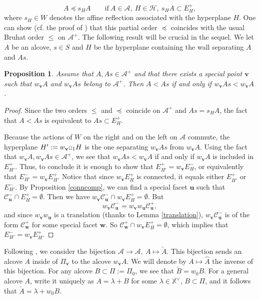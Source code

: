 \documentclass[11pt]{amsart}
\theoremstyle{plain}
\newtheorem{prop}[thm]{Proposition}
\theoremstyle{remark}
\newcommand{\car}{\mbox{\relsize{-5}$\Box$}}
\numberwithin{equation}{section}
\begin{document}
	$$A\preceq s_HA\qquad\text{if}~ A\in\mathcal{A},~H\in \mathscr{H},~s_HA\subset E^+_H,$$
	where $s_H\in W$ denotes the affine reflection associated with the hyperplane $H$. One can show (cf. the proof of \cite[Claim 4.14]{Soergel1997KazhdanLusztigPA}) that this partial order $\preceq$ coincides with the usual Bruhat order $\leq$ on $\mathcal{A}^+$. The following result will be crucial in the sequel. We let $A$ be an alcove, $s\in S$ and $H$ be the hyperplane containing the wall separating $A$ and $As$.
	\begin{prop}\label{reverse order}
		Assume that $A,As\in\mathcal{A}^+$ and that there exists a special point $\mathbf{v}$ such that $w_\mathbf{v}A$ and $w_\mathbf{v}As$ belong to $\mathcal{A}^+$. Then $A<As$ if and only if $w_\mathbf{v}As<w_\mathbf{v}A$.
	\end{prop}
	\begin{proof} 
		Since the two orders $\leq$ and $\preceq$ coincide on $\mathcal{A}^+$ and $As=s_HA$, the fact that $A<As$ is equivalent to $As\subset E^+_H$.
		
		Because the actions of $W$ on the right and on the left on $\mathcal{A}$ commute, the hyperplane $H':=w_\mathbf{v}\car_1 H$ is the one separating $w_\mathbf{v}As$ from $w_\mathbf{v}A$. Using the fact that $w_\mathbf{v}A, w_\mathbf{v}As\in\mathcal{A}^+$, we see that $w_\mathbf{v}As<w_\mathbf{v}A$ if and only if $w_\mathbf{v}A$ is included in $E^+_{H'}$. Thus, to conclude it is enough to show that $E^+_{H'}=w_\mathbf{v}E^-_H$, or equivalently that $E^-_{H'}=w_\mathbf{v}E^+_H$. Notice that since $w_\mathbf{v}E^+_H$ is connected, it equals either $E^+_{H'}$ or $E^-_{H'}$. By Proposition \ref{conncomp}, we can find a special facet $\mathbf{u}$ such that $\mathscr{C}^-_\mathbf{u}\cap E^+_H=\emptyset$.  Then we have $w_\mathbf{v}\mathscr{C}^-_\mathbf{u}\cap w_\mathbf{v}E^+_H=\emptyset$. But 
		$$w_\mathbf{v}\mathscr{C}^-_\mathbf{u}=w_\mathbf{v}w_\mathbf{u}\mathscr{C}^+_\mathbf{u},$$
		and since $w_\mathbf{v}w_\mathbf{u}$ is a translation (thanks to Lemma \ref{translation}), $w_\mathbf{v}\mathscr{C}^-_\mathbf{u}$ is of the form $\mathscr{C}^+_\mathbf{w}$ for some special facet $\mathbf{w}$. So $\mathscr{C}^+_\mathbf{w}\cap w_\mathbf{v}E^+_H=\emptyset$, which implies that $E^-_{H'}=w_\mathbf{v}E^+_H$.
	\end{proof}
	
	Following \cite[§4, §5]{Soergel1997KazhdanLusztigPA}, we consider the bijection $\mathcal{A}\to \mathcal{A},~A\mapsto\check{A}$. This bijection sends an alcove $A$ inside of $\Pi_\mathbf{v}$ to the alcove $w_\mathbf{v}A$. We will denote by $A\mapsto\hat{A}$ the inverse of this bijection. For any alcove $B\subset\Pi:=\Pi_0$, we see that $\check{B}=w_0B$. For a general alcove $A$, write it uniquely as $A=\lambda+B$ for some $\lambda\in\mathbb{X}^\vee$, $B\subset\Pi$, and it follows that $\check{A}=\lambda+w_0B$.
	
\end{document}
